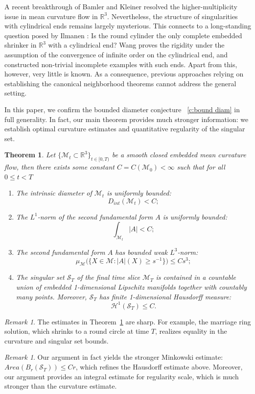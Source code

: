 \documentclass[11pt,reqno]{amsart}
\numberwithin{equation}{section}
\newcommand{\RR}{\mathds{R}}
\newcommand{\cH}{\mathcal{H}}
\newcommand{\cM}{\mathcal{M}}
\newcommand{\cS}{\mathcal{S}}
\newtheorem{theorem}[equation]{Theorem}
\theoremstyle{definition}
\theoremstyle{remark}
\newtheorem{remark}[equation]{Remark}
\theoremstyle{remark}
\theoremstyle{remark}
\theoremstyle{remark}\newtheorem{conjecture}[equation]{Conjecture}
\theoremstyle{remark}\newtheorem{question}[equation]{Question}
\begin{document}
A recent breakthrough of Bamler and Kleiner \cite{BK23} resolved the higher-multiplicity issue in mean curvature flow in $\RR^3$. Nevertheless, the structure of singularities with cylindrical ends remains largely mysterious. This connects to a long-standing question posed by Ilmanen \cite{Il95}: Is the round cylinder the only complete embedded shrinker in $\mathbb{R}^3$ with a cylindrical end? Wang \cite{Wa16a} proves the rigidity under the assumption of the convergence of infinite order on the cylindrical end, and constructed non-trivial incomplete examples with such ends. Apart from this, however, very little is known. As a consequence, previous approaches relying on establishing the canonical neighborhood theorems cannot address the general setting.

In this paper, we confirm the bounded diameter conjecture ~\ref{c:bound diam} in full generality. In fact, our main theorem provides much stronger information: we establish optimal curvature estimates and quantitative regularity of the singular set. 


\begin{theorem}\label{t:main smooth}
    Let $\{\cM_t \subset \RR^3\}_{t\in [0,T)}$ be a smooth closed embedded mean curvature flow, then there exists some constant $C=C(\cM_0)<\infty$ such that for all $0\le t<T$
    \begin{enumerate}
        \item The intrinsic diameter of $\cM_t$ is uniformly bounded:  $$D_{int}(\cM_t) < C;$$
        \item The $L^1$-norm of the second fundamental form $A$ is uniformly bounded: $$\int_{\cM_t} |A| < C;$$
        \item The second fundamental form $A$ has bounded weak $L^3$-norm:
        $$\mu_{\cM}\big( \{ X \in \cM : |A|(X) \ge s^{-1} \} \big) \le C s^3;$$
        \item The singular set $\mathcal{S}_T$ of the final time slice $\mathcal{M}_T$ is contained in a countable union of embedded 1-dimensional Lipschitz manifolds together with countably many points. Moreover, $\cS_T$ has finite 1-dimensional Hausdorff measure:
        $$\cH^1(\cS_T) \le C.$$
    \end{enumerate}
\end{theorem}
\begin{remark}
The estimates in Theorem~\ref{t:main smooth} are sharp. For example, the marriage ring solution, which shrinks to a round circle at time $T$, realizes equality in the curvature and singular set bounds.
\end{remark}
\begin{remark}
    Our argument in fact yields the stronger Minkowski estimate: $Area(B_r(\cS_T)) \le Cr$, which refines the Hausdorff estimate above. Moreover, our argument provides an integral estimate for regularity scale, which is much stronger than the curvature estimate.    
\end{remark}
\end{document}
